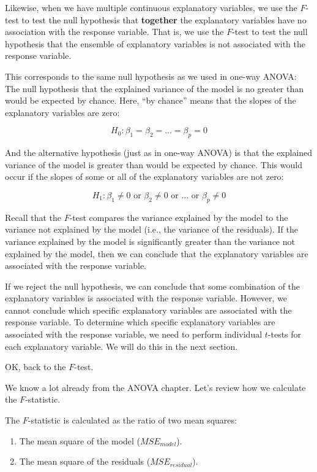 \documentclass[
  letterpaper,
  8pt,
  a4paper]{book}
\providecommand{\tightlist}{%
  \setlength{\itemsep}{0pt}\setlength{\parskip}{0pt}}
\begin{document}
Likewise, when we have multiple continuous explanatory variables, we use
the \(F\)-test to test the null hypothesis that \textbf{together} the
explanatory variables have no association with the response variable.
That is, we use the \(F\)-test to test the null hypothesis that the
ensemble of explanatory variables is not associated with the response
variable.

This corresponds to the same null hypothesis as we used in one-way
ANOVA: The null hypothesis that the explained variance of the model is
no greater than would be expected by chance. Here, ``by chance'' means
that the slopes of the explanatory variables are zero:

\[H_0: \beta_1 = \beta_2 = \ldots = \beta_p = 0\]

And the alternative hypothesis (just as in one-way ANOVA) is that the
explained variance of the model is greater than would be expected by
chance. This would occur if the slopes of some or all of the explanatory
variables are not zero:

\[H_1: \beta_1 \neq 0 \text{ or } \beta_2 \neq 0 \text{ or } \ldots \text{ or } \beta_p \neq 0\]

Recall that the \(F\)-test compares the variance explained by the model
to the variance not explained by the model (i.e., the variance of the
residuals). If the variance explained by the model is significantly
greater than the variance not explained by the model, then we can
conclude that the explanatory variables are associated with the response
variable.

If we reject the null hypothesis, we can conclude that some combination
of the explanatory variables is associated with the response variable.
However, we cannot conclude which specific explanatory variables are
associated with the response variable. To determine which specific
explanatory variables are associated with the response variable, we need
to perform individual \(t\)-tests for each explanatory variable. We will
do this in the next section.

OK, back to the \(F\)-test.

We know a lot already from the ANOVA chapter. Let's review how we
calculate the \(F\)-statistic.

The \(F\)-statistic is calculated as the ratio of two mean squares:

\begin{enumerate}
\def\labelenumi{\arabic{enumi}.}
\tightlist
\item
  The mean square of the model (\(MSE_{model}\)).
\item
  The mean square of the residuals (\(MSE_{residual}\)).
\end{enumerate}
\end{document}
